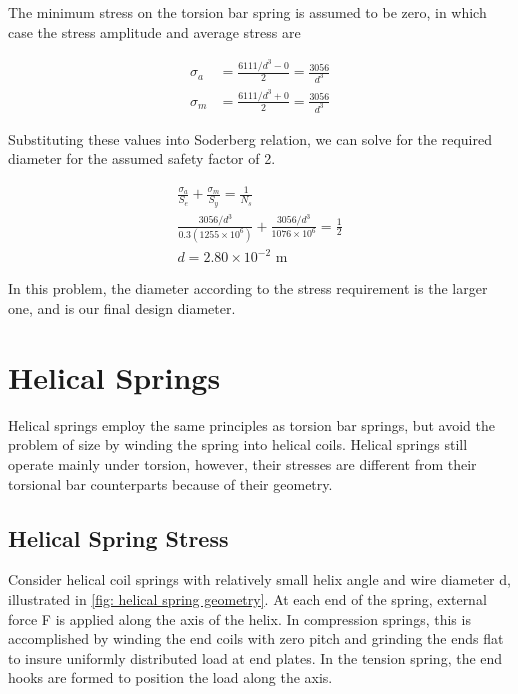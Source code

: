 \documentclass[
10pt,
a4paper,
openany,
svgnames,
]{book}
\begin{document}
\begin{solution}
  The minimum stress on the torsion bar spring is assumed to be zero, in which case the stress amplitude and average stress are

  \begin{align*}
    \sigma_a &= \frac{6111/d^3 - 0}{2} = \frac{3056}{d^3} \\
    \sigma_m &= \frac{6111/d^3 + 0}{2} = \frac{3056}{d^3}
  \end{align*}

  Substituting these values into Soderberg relation, we can solve for the required diameter for the assumed safety factor of 2.

  \begin{gather*}
    \frac{\sigma_a}{S_e} + \frac{\sigma_m}{S_y} = \frac{1}{N_s} \\
    \frac{3056/d^3}{0.3(1255 \times 10^6)} + \frac{3056/d^3}{1076 \times 10^6} = \frac{1}{2} \\
    d = 2.80 \times 10^{-2} \text{ m}
  \end{gather*}

  In this problem, the diameter according to the stress requirement is the larger one, and is our final design diameter.
\end{solution}
  
\section{Helical Springs}

Helical springs employ the same principles as torsion bar springs, but avoid the problem of size by winding the spring into helical coils. Helical springs still operate mainly under torsion, however, their stresses are different from their torsional bar counterparts because of their geometry.

\subsection{Helical Spring Stress}

Consider helical coil springs with relatively small helix angle and wire diameter d, illustrated in \cref{fig: helical spring geometry}. At each end of the spring, external force F is applied along the axis of the helix. In compression springs, this is accomplished by winding the end coils with zero pitch and grinding the ends flat to insure uniformly distributed load at end plates. In the tension spring, the end hooks are formed to position the load along the axis.
\end{document}

